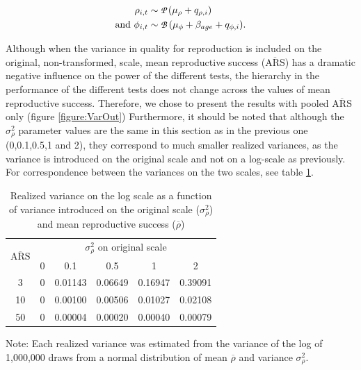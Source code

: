 \begin{subequations}\label{eq:varout}
\begin{align}
\rho_{i,t} &\sim \text{{\fontfamily{pzc}\selectfont P }}(\mu_{\rho}+q_{\rho,i})\\
\text{and } \phi_{i,t} &\sim \text{{\fontfamily{pzc}\selectfont B }}(\mu_{\phi}+\beta_{age}+q_{\phi,i}).
\end{align}
\end{subequations}


Although when the variance in quality for reproduction is included on the original, non-transformed, scale, mean reproductive success ($\overline{\mathrm{ARS}}$) has a dramatic negative influence on the power of the different tests, the hierarchy in the performance of the different tests does not change across the values of mean reproductive success. Therefore, we chose to present the results with pooled $\overline{\mathrm{ARS}}$ only (figure \ref{figure:VarOut})
Furthermore, it should be noted that although the $\sigma_{\rho}^2$ parameter values are the same in this section as in the previous one (0,0.1,0.5,1 and 2), they correspond to much smaller realized variances, as the variance is introduced on the original scale and not on a log-scale as previously. For correspondence between the variances on the two scales, see table \ref{table:Vlink}. 

\begin{table}[ht]
\caption{Realized variance on the log scale as a function of variance introduced on the original scale ($\sigma_{\rho}^2$) and  mean reproductive success ($\overline{\rho}$)}
\begin{center}
\footnotesize
\begin{tabular}{c c c c c c}
\toprule
\multirow{2}{*}{$\overline{\mathrm{ARS}}$} &\multicolumn{5}{c}{$\sigma_{\rho}^2$ on original scale}\\
\cmidrule(r){2-6}
 & 0 & 0.1 & 0.5 & 1 & 2\\
\midrule
3 & 0 & 0.01143 & 0.06649 & 0.16947 & 0.39091 \\
10 & 0 & 0.00100 & 0.00506 & 0.01027 & 0.02108 \\
50 & 0 & 0.00004 & 0.00020 & 0.00040 & 0.00079 \\
\bottomrule
\end{tabular}
\end{center}
\label{table:Vlink}

{\scriptsize Note: Each realized variance was estimated from the variance of the log of 1,000,000 draws from a normal distribution of mean $\overline{\rho}$ and variance $\sigma_{\rho}^2$.}
\end{table}

